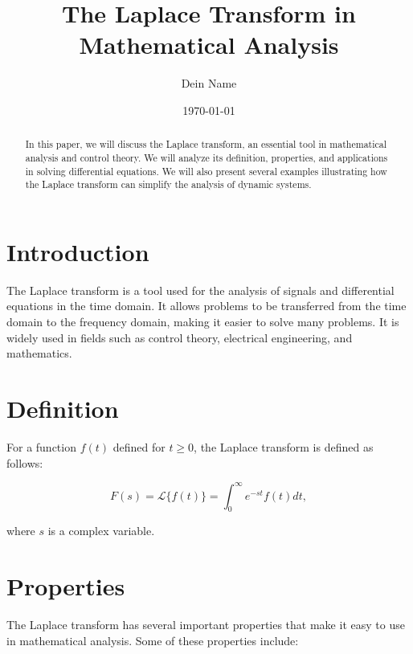 \documentclass{article}
\title{The Laplace Transform in Mathematical Analysis}
\author{Dein Name}
\date{\today}
\begin{document}
\maketitle

\begin{abstract}
In this paper, we will discuss the Laplace transform, an essential tool in mathematical analysis and control theory. We will analyze its definition, properties, and applications in solving differential equations. We will also present several examples illustrating how the Laplace transform can simplify the analysis of dynamic systems.
\end{abstract}

\section{Introduction}

The Laplace transform is a tool used for the analysis of signals and differential equations in the time domain. It allows problems to be transferred from the time domain to the frequency domain, making it easier to solve many problems. It is widely used in fields such as control theory, electrical engineering, and mathematics.

\section{Definition}

For a function $f(t)$ defined for $t \geq 0$, the Laplace transform is defined as follows:

\begin{equation}
F(s) = \mathcal{L}\{f(t)\} = \int_{0}^{\infty} e^{-st} f(t) dt,
\end{equation}

where $s$ is a complex variable.

\section{Properties}

The Laplace transform has several important properties that make it easy to use in mathematical analysis. Some of these properties include:
\end{document}
